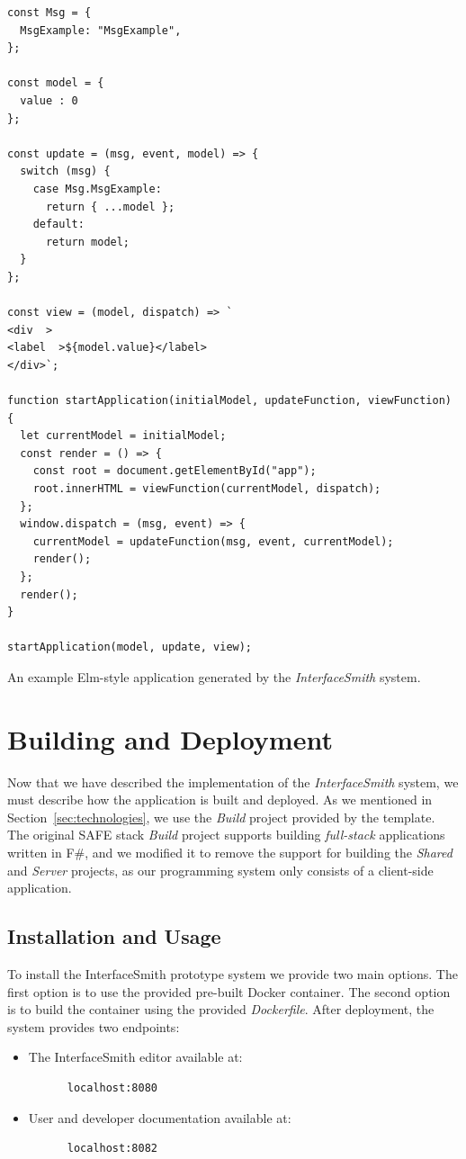\begin{listing}[H]
	\begin{lstlisting}
const Msg = {
  MsgExample: "MsgExample",
};

const model = {
  value : 0
};

const update = (msg, event, model) => {
  switch (msg) {
    case Msg.MsgExample:
      return { ...model };
    default:
      return model;
  }
};

const view = (model, dispatch) => `
<div  >
<label  >${model.value}</label>
</div>`;

function startApplication(initialModel, updateFunction, viewFunction) {
  let currentModel = initialModel;
  const render = () => {
    const root = document.getElementById("app");
    root.innerHTML = viewFunction(currentModel, dispatch);
  };
  window.dispatch = (msg, event) => {
    currentModel = updateFunction(msg, event, currentModel);
    render();
  };
  render();
}

startApplication(model, update, view);
	\end{lstlisting}
	\caption{An example Elm-style application generated by the \emph{InterfaceSmith} system.}\label{fig:code-generation}
\end{listing}


\clearpage
\section{Building and Deployment}
\label{sec:build}
Now that we have described the implementation of the \emph{InterfaceSmith} system, we must describe how the application is built and deployed.
As we mentioned in Section~\ref{sec:technologies}, we use the \emph{Build} project provided by the \citet{safestack} template.
The original SAFE stack \emph{Build} project supports building \emph{full-stack} applications written in F\#, and we modified it to remove the support for building
the \emph{Shared} and \emph{Server} projects, as our programming system only consists of a client-side application.

\medskip
\subsection{Installation and Usage}
To install the InterfaceSmith prototype system we provide two main options.
The first option is to use the provided pre-built Docker container.
The second option is to build the container using the provided \emph{Dockerfile}.
After deployment, the system provides two endpoints:
\begin{itemize}
	\item The InterfaceSmith editor available at:
	      \begin{lstlisting}
      localhost:8080
    \end{lstlisting}
	\item User and developer documentation available at:
	      \begin{lstlisting}
      localhost:8082
    \end{lstlisting}
\end{itemize}
